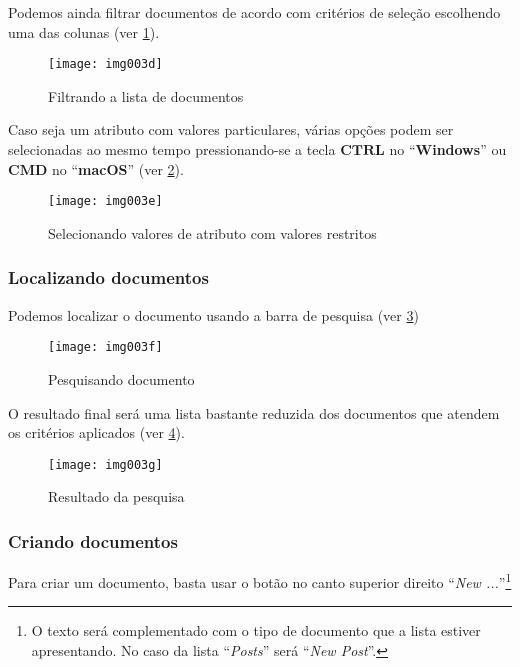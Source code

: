 Podemos ainda filtrar documentos de acordo com critérios de seleção escolhendo uma das colunas (ver \cref{RS0006:fig:img003d}).

\begin{figure}[!ht]
    \centering
    \texttt{[image: img003d]}
    \caption{Filtrando a lista de documentos}\label{RS0006:fig:img003d}
\end{figure}

Caso seja um atributo com valores particulares, várias opções podem ser selecionadas ao mesmo tempo pressionando-se a tecla $\bm{CTRL}$ no ``\textbf{Windows}'' ou $\bm{CMD}$ no ``\textbf{macOS}'' (ver \cref{RS0006:fig:img003e}).

\begin{figure}[!ht]
    \centering
    \texttt{[image: img003e]}
    \caption{Selecionando valores de atributo com valores restritos}\label{RS0006:fig:img003e}
\end{figure}

\subsubsection{Localizando documentos}

Podemos localizar o documento usando a barra de pesquisa (ver \cref{RS0006:fig:img003f})

\begin{figure}[!ht]
    \centering
    \texttt{[image: img003f]}
    \caption{Pesquisando documento}\label{RS0006:fig:img003f}
\end{figure}

O resultado final será uma lista bastante reduzida dos documentos que atendem os critérios aplicados (ver \cref{RS0006:fig:img003g}).

\begin{figure}[!ht]
    \centering
    \texttt{[image: img003g]}
    \caption{Resultado da pesquisa}\label{RS0006:fig:img003g}
\end{figure}

\subsubsection{Criando documentos}

Para criar um documento, basta usar o botão no canto superior direito ``\textit{New ...}''\footnote{O texto será complementado com o tipo de documento que a lista estiver apresentando. No caso da lista ``\textit{Posts}'' será ``\textit{New Post}''.}

